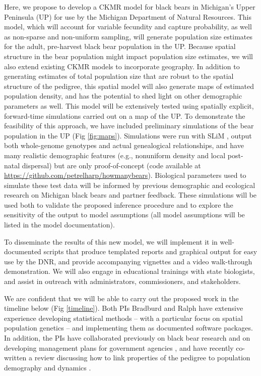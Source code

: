 \documentclass[11pt]{article}
\begin{document}
Here, we propose to develop a CKMR model 
for black bears in Michigan's Upper Peninsula (UP) 
for use by the Michigan Department of Natural Resources.
This model, which will account for 
variable fecundity and capture probability, 
as well as non-sparse and non-uniform sampling, 
will generate population size estimates 
for the adult, pre-harvest black bear population in the UP. 
Because spatial structure in the bear population might impact 
population size estimates, 
we will also extend existing CKMR models 
to incorporate geography.
In addition to generating estimates of total population size 
that are robust to the spatial structure of the pedigree, 
this spatial model will also generate maps of estimated 
population density, 
and has the potential to shed light 
on other demographic parameters as well.
This model will be extensively tested using spatially explicit,  
forward-time simulations carried out on a map of the UP. 
To demonstrate the feasibility of this approach, 
we have included preliminary simulations 
of the bear population in the UP (Fig \ref{fig:maps}).
Simulations were run with SLiM \citep{haller2018forward},
output both whole-genome genotypes and actual genealogical relationships,
and have many realistic demographic features 
(e.g., nonuniform density and local post-natal dispersal) 
but are only proof-of-concept
(code available at \url{https://github.com/petrelharp/howmanybears}).
Biological parameters used to simulate these test data 
will be informed by previous demographic and ecological 
research on Michigan black bears \citep{moore2014application} and partner feedback.
These simulations will be used both to 
validate the proposed inference procedure 
and to explore the sensitivity of the output to model assumptions 
(all model assumptions will be listed in the model documentation).

To disseminate the results of this new model, 
we will implement it in well-documented scripts 
that produce templated reports and graphical output
for easy use by the DNR, 
and provide accompanying vignettes 
and a video walk-through demonstration. 
We will also engage in educational trainings with state biologists, 
and assist in outreach with 
administrators, commissioners, and stakeholders.

We are confident that we will be able to 
carry out the proposed work in the timeline below (Fig \ref{timeline}).
Both PIs Bradburd and Ralph have extensive 
experience developing statistical methods \citep{bedassle, SpaceMix, bradburd2018inferring} -- 
with a particular focus on spatial population genetics \citep{bradburd2019spatial, Battey_etal_2020} -- 
and implementing them as documented software packages.
In addition, the PIs have collaborated previously 
on black bear research \citep{bradburd2018inferring}
and on developing management plans 
for government agencies \citep{shaffer2017desert}, 
and have recently co-written a review discussing how to link properties of the pedigree
to population demography and dynamics \citep{bradburd2019spatial}.
\end{document}
